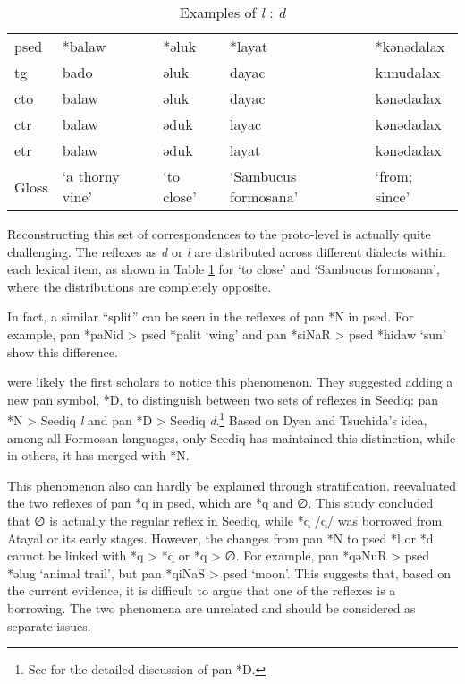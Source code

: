 \begin{table}[!htbp]
\centering
\caption{Examples of \textit{l} : \textit{d}}
\label{tab:irr_ld}
\begin{tabular}{lllll}
\hline
\acs{psed} & *balaw        & *əluk    & *layat             & *kənədalax    \\ \hdashline
\acs{tg}   & bado            & əluk       & dayac                & kunudalax     \\
\acs{cto}  & balaw           & əluk       & dayac                & kənədadax     \\
\acs{ctr}  & balaw           & əduk       & layac                & kənədadax     \\
\acs{etr}  & balaw           & əduk       & layat                & kənədadax     \\ \hline
Gloss      & `a thorny vine' & `to close' & `Sambucus formosana' & `from; since' \\ \hline
\end{tabular}
\end{table}

Reconstructing this set of correspondences to the proto-level is actually quite challenging. The reflexes as \textit{d} or \textit{l} are distributed across different dialects within each lexical item, as shown in Table \ref{tab:irr_ld} for `to close' and `Sambucus formosana', where the distributions are completely opposite. 

In fact, a similar ``split'' can be seen in the reflexes of \acl{pan} *N in \acl{psed}. For example, \acs{pan} *paNid > \acs{psed} *palit `wing' and \acs{pan} *siNaR > \acs{psed} *hidaw `sun' show this difference.

\textcite{dyen1987d5} were likely the first scholars to notice this phenomenon. They suggested adding a new \acs{pan} symbol, *D, to distinguish between two sets of reflexes in Seediq: \acs{pan} *N > Seediq \textit{l} and \acs{pan} *D > Seediq \textit{d}.\footnote{See \textcite{tsuchida1976tsouic} for the detailed discussion of \acs{pan} *D. } Based on Dyen and Tsuchida's idea, among all Formosan languages, only Seediq has maintained this distinction, while in others, it has merged with *N.

This phenomenon also can hardly be explained through stratification. \textcite{song2024sedq} reevaluated the two reflexes of \acl{pan} *q in \acl{psed}, which are *q and ∅. This study concluded that ∅ is actually the regular reflex in Seediq, while *q /q/ was borrowed from Atayal or its early stages. However, the changes from \ac{pan} *N to \ac{psed} *l or *d cannot be linked with *q > *q or *q > ∅. For example, \ac{pan} *qəNuR > \ac{psed} *əlug `animal trail', but \ac{pan} *qiNaS > \ac{psed} `moon'. This suggests that, based on the current evidence, it is difficult to argue that one of the reflexes is a borrowing. The two phenomena are unrelated and should be considered as separate issues. 

